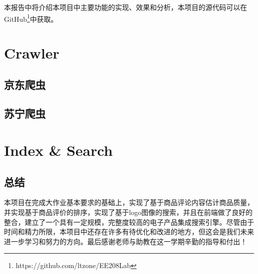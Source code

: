 \documentclass{book}
\begin{document}
本报告中将介绍本项目中主要功能的实现、效果和分析，本项目的源代码可以在GitHub\footnote{https://github.com/ltzone/EE208Lab}中获取。

\mainmatter


\part{Crawler}

\chapter{京东爬虫}





\chapter{苏宁爬虫}







\part{Index \& Search}



\backmatter


\chapter{总结}

本项目在完成大作业基本要求的基础上，实现了基于商品评论内容估计商品质量，并实现基于商品评价的排序，实现了基于logo图像的搜索，并且在前端做了良好的整合，建立了一个具有一定规模，完整度较高的电子产品集成搜索引擎。尽管由于时间和精力所限，本项目中还存在许多有待优化和改进的地方，但这会是我们未来进一步学习和努力的方向。最后感谢老师与助教在这一学期辛勤的指导和付出！
\end{document}
